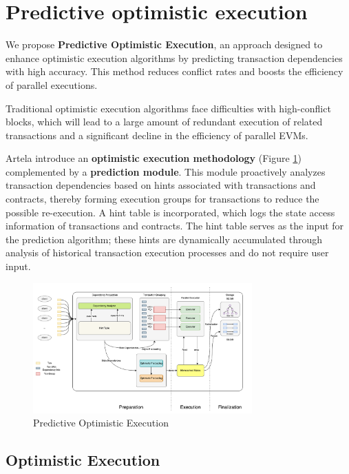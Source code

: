 
\section{Predictive optimistic execution}

We propose \textbf{Predictive Optimistic Execution}, an approach designed to enhance optimistic execution algorithms by predicting transaction dependencies with high accuracy. This method reduces conflict rates and boosts the efficiency of parallel executions.

Traditional optimistic execution algorithms face difficulties with high-conflict blocks, which will lead to a large amount of redundant execution of related transactions and a significant decline in the efficiency of parallel EVMs. 

Artela introduce an \textbf{optimistic execution methodology} (Figure \ref{fig:predictive_optimistic_execution}) complemented by a \textbf{prediction module}. This module proactively analyzes transaction dependencies based on hints associated with transactions and contracts, thereby forming execution groups for transactions to reduce the possible re-execution. A hint table is incorporated, which logs the state access information of transactions and contracts. The hint table serves as the input for the prediction algorithm; these hints are dynamically accumulated through analysis of historical transaction execution processes and do not require user input.

\begin{figure}[htp]
\centering
\includegraphics[width=0.75\textwidth]{sections/images/predictive-optimistic-execution.png}
\caption{Predictive Optimistic Execution}
\label{fig:predictive_optimistic_execution}
\end{figure}

\subsection{Optimistic Execution}


